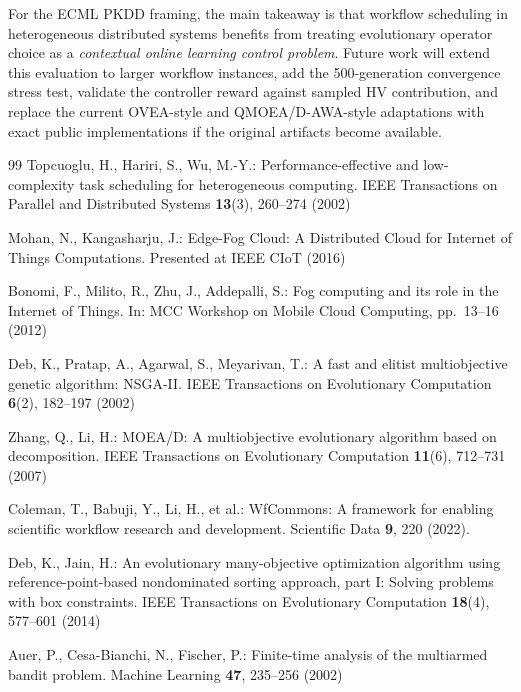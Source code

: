 \documentclass[runningheads]{llncs}
\begin{document}
For the ECML PKDD framing, the main takeaway is that workflow scheduling in heterogeneous distributed systems benefits from treating evolutionary operator choice as a \emph{contextual online learning control problem}. Future work will extend this evaluation to larger workflow instances, add the 500-generation convergence stress test, validate the controller reward against sampled HV contribution, and replace the current OVEA-style and QMOEA/D-AWA-style adaptations with exact public implementations if the original artifacts become available.
\enlargethispage{3\baselineskip}
\begin{thebibliography}{99}
\footnotesize
\setlength{\itemsep}{0pt}
\setlength{\parskip}{0pt}
\setlength{\parsep}{0pt}
Topcuoglu, H., Hariri, S., Wu, M.-Y.: Performance-effective and low-complexity task scheduling for heterogeneous computing. IEEE Transactions on Parallel and Distributed Systems \textbf{13}(3), 260--274 (2002)

Mohan, N., Kangasharju, J.: Edge-Fog Cloud: A Distributed Cloud for Internet of Things Computations. Presented at IEEE CIoT (2016)

Bonomi, F., Milito, R., Zhu, J., Addepalli, S.: Fog computing and its role in the Internet of Things. In: MCC Workshop on Mobile Cloud Computing, pp.~13--16 (2012)

Deb, K., Pratap, A., Agarwal, S., Meyarivan, T.: A fast and elitist multiobjective genetic algorithm: NSGA-II. IEEE Transactions on Evolutionary Computation \textbf{6}(2), 182--197 (2002)

Zhang, Q., Li, H.: MOEA/D: A multiobjective evolutionary algorithm based on decomposition. IEEE Transactions on Evolutionary Computation \textbf{11}(6), 712--731 (2007)

Coleman, T., Babuji, Y., Li, H., et al.: WfCommons: A framework for enabling scientific workflow research and development. Scientific Data \textbf{9}, 220 (2022).

Deb, K., Jain, H.: An evolutionary many-objective optimization algorithm using reference-point-based nondominated sorting approach, part I: Solving problems with box constraints. IEEE Transactions on Evolutionary Computation \textbf{18}(4), 577--601 (2014)

Auer, P., Cesa-Bianchi, N., Fischer, P.: Finite-time analysis of the multiarmed bandit problem. Machine Learning \textbf{47}, 235--256 (2002)


\end{thebibliography}
\end{document}
